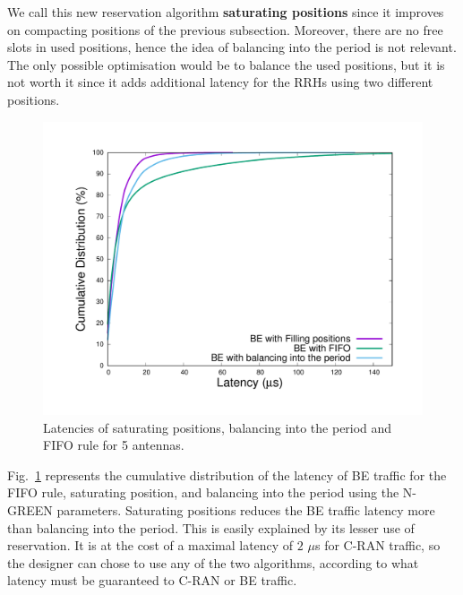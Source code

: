 \documentclass[10pt, conference, letterpaper]{IEEEtran}
\begin{document}
 We call this new reservation algorithm \textbf{saturating positions} since it improves on compacting positions of the previous subsection. Moreover, there are no free slots in used positions, hence the idea of balancing into the period is not relevant. The only possible optimisation would be to balance the used positions, but it is not worth it since it adds additional latency for the RRHs using two different positions. 
%  

 \vspace{-0.4cm}
\begin{figure}[h]
\begin{center}   

      \includegraphics[scale=0.25]{splitres}
     \caption{Latencies of saturating positions, balancing into the period and FIFO rule for 5 antennas.}   \label{fig:splitres}
\end{center}
  \end{figure}
    \vspace{-0.4cm}

Fig.~\ref{fig:splitres} represents the cumulative distribution of the latency of BE traffic for the FIFO rule, saturating position, and balancing into the period using the N-GREEN parameters. Saturating positions reduces the BE traffic latency more than balancing into the period. This is easily explained by its lesser use of reservation. It is at the cost of a maximal latency of $2$ $\mu$s for C-RAN traffic, so the designer can chose to use any of the two algorithms, according to what latency must be guaranteed to C-RAN or BE traffic.
\end{document}
